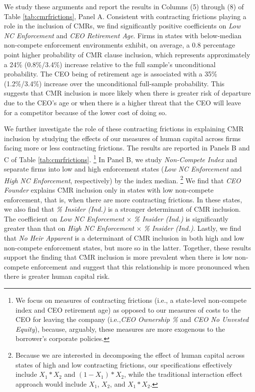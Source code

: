 \documentclass[a4paper,12pt]{article}
\begin{document}
We study these arguments and report the results in Columns (5) through (8) of Table \ref{tab:cmrfrictions}, Panel A.
Consistent with contracting frictions playing a role in the inclusion of CMRs, we find significantly positive coefficients on \textit{Low NC Enforcement} and \textit{CEO Retirement Age}.
Firms in states with below-median non-compete enforcement environments exhibit, on average, a 0.8 percentage point higher probability of CMR clause inclusion, which represents approximately a 24\% (0.8\%/3.4\%) increase relative to the full sample's unconditional probability.
The CEO being of retirement age is associated with a 35\% (1.2\%/3.4\%) increase over the unconditional full-sample probability.
This suggests that CMR inclusion is more likely when there is greater risk of departure due to the CEO's age or when there is a higher threat that the CEO will leave for a competitor because of the lower cost of doing so.



We further investigate the role of these contracting frictions in explaining CMR inclusion by studying the effects of our measures of human capital across firms facing more or less contracting frictions.
The results are reported in Panels B and C of Table \ref{tab:cmrfrictions}.%
    \footnote{We focus on measures of contracting frictions (i.e., a state-level non-compete index and CEO retirement age) as opposed to our measures of costs to the CEO for leaving the company (i.e.,\textit{CEO Ownership \%} and \textit{CEO No Unvested Equity}), because, arguably, these measures are more exogenous to the borrower's corporate policies.}
In Panel B, we study \textit{Non-Compete Index} and separate firms into low and high enforcement states (\textit{Low NC Enforcement} and \textit{High NC Enforcement}, respectively) by the index median.%
    \footnote{Because we are interested in decomposing the effect of human capital across states of high and low contracting frictions, our specifications effectively include $X_1*X_2$ and $(1-X_1)*X_2$, while the traditional interaction effect approach would include $X_1$, $X_2$, and $X_1*X_2$.}
We find that \textit{CEO Founder} explains CMR inclusion only in states with low non-compete enforcement, that is, when there are more contracting frictions.
In these states, we also find that \textit{\% Insider (Ind.)} is a stronger determinant of CMR inclusion.
The coefficient on \textit{Low NC Enforcement} $\times$ \textit{\% Insider (Ind.)} is significantly greater than that on \textit{High NC Enforcement} $\times$ \textit{\% Insider (Ind.)}.
Lastly, we find that \textit{No Heir Apparent} is a determinant of CMR inclusion in both high and low non-compete enforcement states, but more so in the latter.
Together, these results support the finding that CMR inclusion is more prevalent when there is low non-compete enforcement and suggest that this relationship is more pronounced when there is greater human capital risk.
\end{document}
